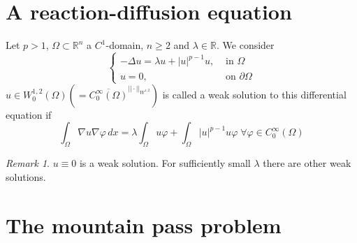\documentclass[a4paper, 12pt]{article}
\theoremstyle{plain}
\theoremstyle{definition}
\theoremstyle{lemma}
\theoremstyle{remark}
\newtheorem{remark}[theorem]{Remark}
\theoremstyle{corollary}
\theoremstyle{example}
\begin{document}
\section{A reaction-diffusion equation}
	Let $p>1$, $\Omega \subset \mathbb{R}^n$ a $C^1$-domain, $n \geq 2$ and $\lambda \in \mathbb{R}$. We consider \[\begin{cases}
		-\Delta u = \lambda u + \left|u\right|^{p-1} u, & \text{ in } \Omega\\
		u = 0, & \text{ on } \partial \Omega
	\end{cases}\]
	$u \in W_0^{1,2}(\Omega) \left( = \overline{C_0^\infty(\Omega)}^{||\cdot||_{W^{1,2}}}\right)$ is called a weak solution to this differential equation if \[\int_\Omega \nabla u \nabla \varphi \, dx = \lambda \int_\Omega u \varphi + \int_\Omega \left|u\right|^{p-1} u \varphi \; \forall \varphi \in C_0^\infty(\Omega)\]
	\begin{remark}
		$u\equiv 0$ is a weak solution. For sufficiently small $\lambda$ there are other weak solutions.
	\end{remark}
\section{The mountain pass problem}
\end{document}
